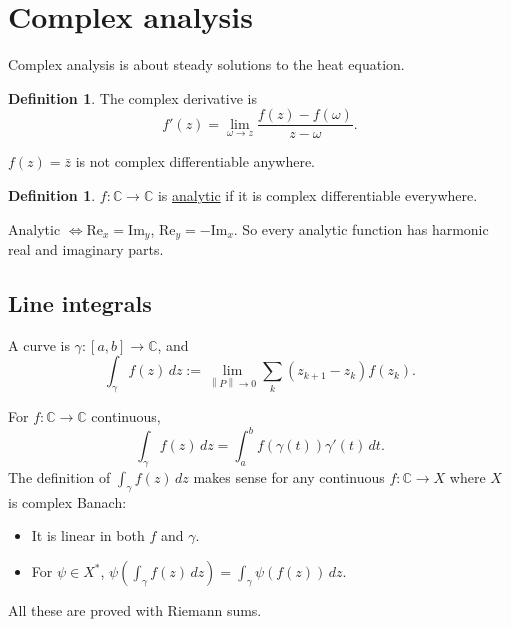 \documentclass[12pt]{article}
\newcommand{\norm}[1]{\left\| #1 \right\|}
\newcommand{\C}{\mathbb{C}}
\theoremstyle{definition}
\newtheorem{defn}[thm]{Definition}
\begin{document}
\section{Complex analysis}

Complex analysis is about steady solutions to the heat equation.

\begin{defn}
	The complex derivative is
	\begin{equation*}
		f'(z) = \lim_{\omega \to z} \frac{f(z) - f(\omega)}{z - \omega}.
	\end{equation*}
\end{defn}

\noindent $f(z) = \bar{z}$ is not complex differentiable anywhere.

\begin{defn}
	$f : \C \to \C$ is \underline{analytic} if it is complex differentiable everywhere.
\end{defn}

\noindent Analytic $\iff \mathrm{Re}_x = \mathrm{Im}_y$, $\mathrm{Re}_y = -\mathrm{Im}_x$.
So every analytic function has harmonic real and imaginary parts.

\subsection*{Line integrals}

A curve is $\gamma : [a,b] \to \C$, and
\begin{equation*}
	\int_\gamma f(z) \, dz := \lim_{\norm{P} \to 0} \sum_k (z_{k+1} - z_k) f(z_k).
\end{equation*}
\begin{center}
\end{center}
For $f : \C \to \C$ continuous,
\begin{equation*}
	\int_\gamma f(z) \, dz = \int_a^b f(\gamma(t)) \gamma'(t) \, dt.
\end{equation*}
The definition of $\int_\gamma f(z) \, dz$ makes sense for any continuous $f : \C \to X$ where $X$ is complex Banach:
\begin{itemize}[nosep]
	\item It is linear in both $f$ and $\gamma$.
	\item For $\psi \in X^*$, $\psi \left( \int_\gamma f(z) \, dz \right) = \int_\gamma \psi(f(z)) \, dz$.
\end{itemize}
All these are proved with Riemann sums.
\end{document}
